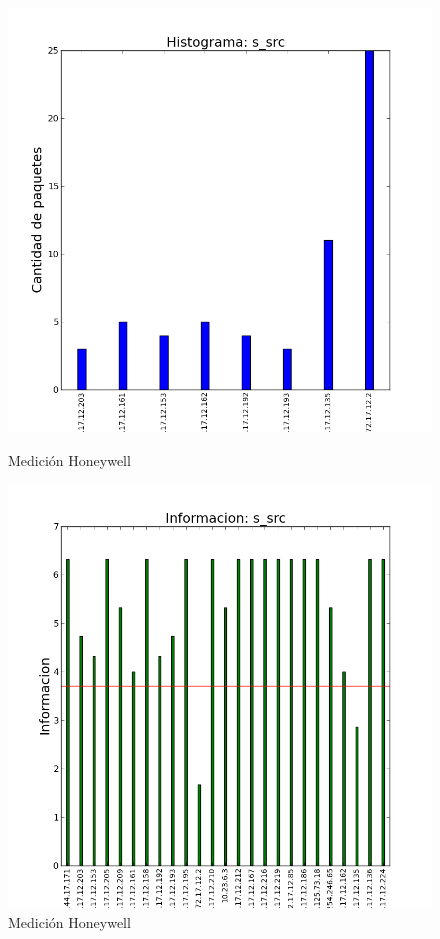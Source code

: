 \documentclass[10pt, a4paper]{article}
\begin{document}
\begin{figure}[H]
   \begin{minipage}{0.5\linewidth}
     \includegraphics[width=\linewidth]{../imgs/snifAlto-ips_s_src_hist.png}
     \caption{Medición Honeywell}\label{fig:Alto-src-hist}
   \end{minipage}
  \hfill
   \begin{minipage}{0.5\linewidth}
     \includegraphics[width=\linewidth]{../imgs/snifAlto-ips_s_src_info.png}
     \caption{Medición Honeywell}\label{fig:Alto-src-info}
   \end{minipage}
 \end{figure}
\end{document}
